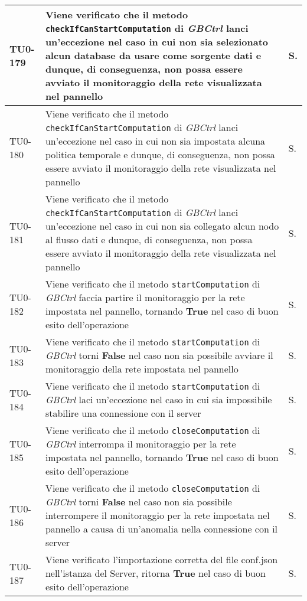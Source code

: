 \begin{longtable}{|C{.15\textwidth}|m{.66\textwidth}|C{.10\textwidth}|}
\hline
{}TU0-179 & Viene verificato che il metodo \texttt{checkIfCanStartComputation} di \textit{GBCtrl} lanci un'eccezione nel caso in cui non sia selezionato alcun database da usare come sorgente dati e dunque, di conseguenza, non possa essere avviato il monitoraggio della rete visualizzata nel pannello & S.\\
\hline
TU0-180 & Viene verificato che il metodo \texttt{checkIfCanStartComputation} di \textit{GBCtrl} lanci un'eccezione nel caso in cui non sia impostata alcuna politica temporale e dunque, di conseguenza, non possa essere avviato il monitoraggio della rete visualizzata nel pannello & S.\\
\hline
{}TU0-181 & Viene verificato che il metodo \texttt{checkIfCanStartComputation} di \textit{GBCtrl} lanci un'eccezione nel caso in cui non sia collegato alcun nodo al flusso dati e dunque, di conseguenza, non possa essere avviato il monitoraggio della rete visualizzata nel pannello & S.\\
\hline
TU0-182 & Viene verificato che il metodo \texttt{startComputation} di \textit{GBCtrl} faccia partire il monitoraggio per la rete impostata nel pannello, tornando \textbf{True} nel caso di buon esito dell'operazione & S.\\
\hline
{}TU0-183 & Viene verificato che il metodo \texttt{startComputation} di \textit{GBCtrl} torni \textbf{False} nel caso non sia possibile avviare il monitoraggio della rete impostata nel pannello & S.\\
\hline
TU0-184 & Viene verificato che il metodo \texttt{startComputation} di \textit{GBCtrl} laci un'eccezione nel caso in cui sia impossibile stabilire una connessione con il server & S.\\
\hline
{}TU0-185 & Viene verificato che il metodo \texttt{closeComputation} di \textit{GBCtrl} interrompa il monitoraggio per la rete impostata nel pannello, tornando \textbf{True} nel caso di buon esito dell'operazione & S.\\
\hline
TU0-186 & Viene verificato che il metodo \texttt{closeComputation} di \textit{GBCtrl} torni \textbf{False} nel caso non sia possibile interrompere il monitoraggio per la rete impostata nel pannello a causa di un'anomalia nella connessione con il server & S.\\
\hline
{}TU0-187 & Viene verificato l'importazione corretta del file conf.json nell'istanza del Server, ritorna \textbf{True} nel caso di buon esito dell'operazione & S.\\

\end{longtable}
